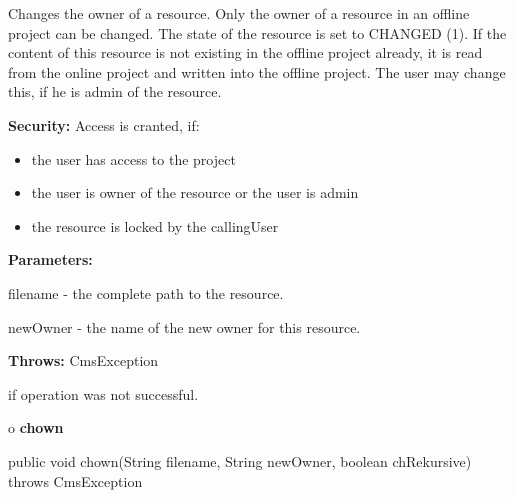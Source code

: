 \begin{description}
\htmlDD Changes the owner of a resource. \htmlBR
Only the owner of a resource in an offline project can be changed. The state
of the resource is set to CHANGED (1). If the content of this resource is not
existing in the offline project already, it is read from the online project
and written into the offline project. The user may change this, if he is admin
of the resource.

{\bf Security:} Access is cranted, if:

\begin{itemize}
\item the user has access to the project
\item the user is owner of the resource or the user is admin
\item the resource is locked by the callingUser
\end{itemize}

\begin{description}
\item {\bf Parameters:}

filename - the complete path to the resource.

newOwner - the name of the new owner for this resource.
\item {\bf Throws:} CmsException

if operation was not successful.
\end{description}

\end{description}

o {\bf chown}

\begin{PRE}
 public void chown(String filename,
                   String newOwner,
                   boolean chRekursive) throws CmsException
\end{PRE}

